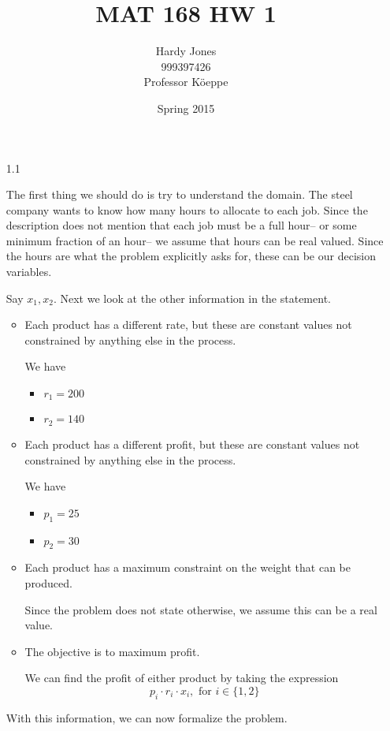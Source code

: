 \documentclass[12pt,letterpaper]{article}
\title{MAT 168 HW 1\vspace{-2ex}}
\author{Hardy Jones\\
        999397426\\
        Professor K\"{o}eppe\vspace{-2ex}}
\date{Spring 2015}
\newcommand*\constant[1]{
  Each product has a different #1,
  but these are constant values not constrained by anything else in the process.
}
\newcommand*\genericconstraint[2]{
  Each product has a #1 constraint on #2.
}
\newcommand*\maximumconstraint[1]{
  \genericconstraint{maximum}{#1}
}
\newcommand*\genericobjective[2]{
  The objective is to #1 #2.
}
\newcommand*\maximumobjective[1]{
  \genericobjective{maximum}{#1}
}
\begin{document}
  \maketitle

  \begin{enumerate}
    \item [1.1]

      The first thing we should do is try to understand the domain.
      The steel company wants to know how many hours to allocate to each job.
      Since the description does not mention that each job must be a full hour--%
      or some minimum fraction of an hour--%
      we assume that hours can be real valued.
      Since the hours are what the problem explicitly asks for,
      these can be our decision variables.

      Say $x_1, x_2$. Next we look at the other information in the statement.
      \begin{itemize}
        \item
          \constant{rate}

          We have
          \begin{itemize}
            \item $r_1 = 200$
            \item $r_2 = 140$
          \end{itemize}

        \item
          \constant{profit}

          We have
          \begin{itemize}
            \item $p_1 = 25$
            \item $p_2 = 30$
          \end{itemize}
        \item
          \maximumconstraint{the weight that can be produced}
          Since the problem does not state otherwise,
          we assume this can be a real value.
        \item
          \maximumobjective{profit}

          We can find the profit of either product by taking the expression
          \[
            p_i \cdot r_i \cdot x_i, \text{ for } i \in \{1, 2\}
          \]
      \end{itemize}

      With this information, we can now formalize the problem.


\end{enumerate}
\end{document}
